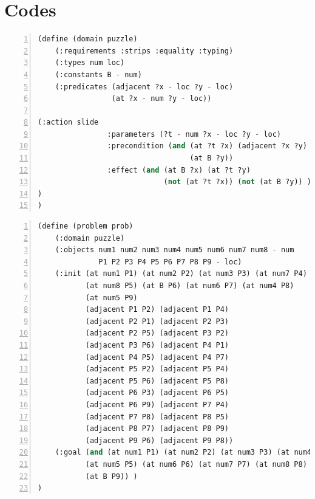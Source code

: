 ﻿\documentclass[a4paper, 11pt]{article}
\begin{document}
\section{Codes}
\begin{lstlisting}[title=domain\_puzzle.pddl,frame=single,language=lisp,numbers=left]
(define (domain puzzle)
    (:requirements :strips :equality :typing)
    (:types num loc)
    (:constants B - num)
    (:predicates (adjacent ?x - loc ?y - loc)
                 (at ?x - num ?y - loc))

(:action slide
                :parameters (?t - num ?x - loc ?y - loc)
                :precondition (and (at ?t ?x) (adjacent ?x ?y)
                                   (at B ?y))
                :effect (and (at B ?x) (at ?t ?y)
                             (not (at ?t ?x)) (not (at B ?y)) )
)
)
\end{lstlisting}

\begin{lstlisting}[title=puzzle.pddl,frame=single,language=lisp,numbers=left]
(define (problem prob)
	(:domain puzzle)
	(:objects num1 num2 num3 num4 num5 num6 num7 num8 - num
	          P1 P2 P3 P4 P5 P6 P7 P8 P9 - loc)
	(:init (at num1 P1) (at num2 P2) (at num3 P3) (at num7 P4)
	       (at num8 P5) (at B P6) (at num6 P7) (at num4 P8)
	       (at num5 P9)
	       (adjacent P1 P2) (adjacent P1 P4)
	       (adjacent P2 P1) (adjacent P2 P3)
	       (adjacent P2 P5) (adjacent P3 P2)
	       (adjacent P3 P6) (adjacent P4 P1)
	       (adjacent P4 P5) (adjacent P4 P7)
	       (adjacent P5 P2) (adjacent P5 P4)
	       (adjacent P5 P6) (adjacent P5 P8)
	       (adjacent P6 P3) (adjacent P6 P5)
	       (adjacent P6 P9) (adjacent P7 P4)
	       (adjacent P7 P8) (adjacent P8 P5)
	       (adjacent P8 P7) (adjacent P8 P9)
	       (adjacent P9 P6) (adjacent P9 P8))
	(:goal (and (at num1 P1) (at num2 P2) (at num3 P3) (at num4 P4)
	       (at num5 P5) (at num6 P6) (at num7 P7) (at num8 P8)
	       (at B P9)) )
)
\end{lstlisting}
\end{document}
